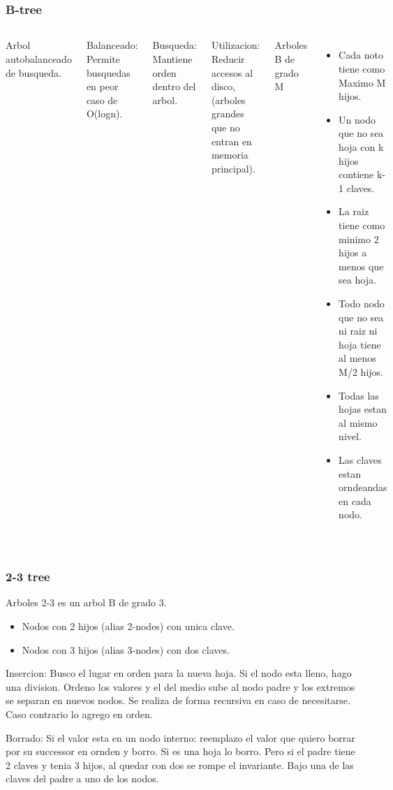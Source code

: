\documentclass[10pt,handout]{beamer}
\begin{document}
\section{}
\begin{frame}
\frametitle{B-tree}

\begin{columns}
        Arbol autobalanceado de busqueda.

Balanceado: Permite busquedas en peor caso de O(logn).

Busqueda: Mantiene orden dentro del arbol.

Utilizacion: Reducir accesos al disco, (arboles grandes que no entran en memoria principal).

Arboles B de grado M
        \begin{itemize}
          \item Cada noto tiene como Maximo M hijos.
          \item Un nodo que no sea hoja con k hijos contiene k-1 claves.
          \item La raiz tiene como minimo 2 hijos a menos que sea hoja.
          \item Todo nodo que no sea ni raiz ni hoja tiene al menos M/2 hijos.
          \item Todas las hojas estan al mismo nivel.
          \item Las claves estan orndeandas en cada nodo.
        \end{itemize}
\end{columns}
\end{frame}

\section{}
\begin{frame}
\frametitle{2-3 tree}

Arboles 2-3 es un arbol B de grado 3.
\begin{itemize}
  \item Nodos con 2 hijos (alias 2-nodes) con unica clave.
  \item Nodos con 3 hijos (alias 3-nodes) con dos claves.
\end{itemize}

Insercion: Busco el lugar en orden para la nueva hoja. Si el nodo esta lleno, hago una division.
Ordeno los valores y el del medio sube al nodo padre y los extremos se separan en nuevos nodos.
Se realiza de forma recursiva en caso de necesitarse.
Caso contrario lo agrego en orden.

Borrado: Si el valor esta en un nodo interno: reemplazo el valor que quiero borrar por su
successor en ornden y borro.
Si es una hoja lo borro. Pero si el padre tiene 2 claves y tenia 3 hijos, al quedar con dos se rompe el invariante.
Bajo una de las claves del padre a uno de los nodos.
\end{frame}
\end{document}
